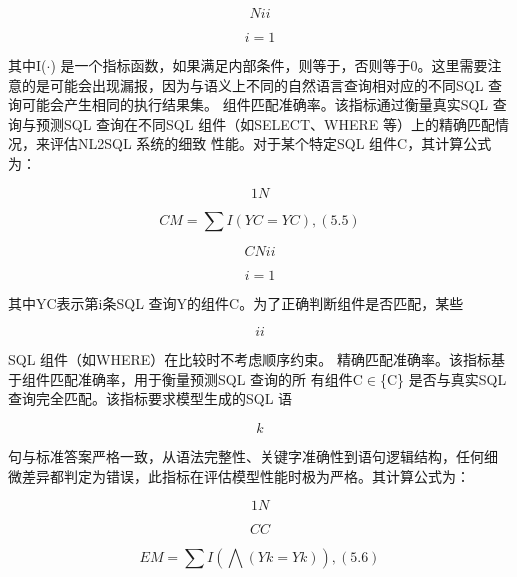 \documentclass[12pt,a4paper,openright,UTF8]{ctexbook}
\begin{document}
\begin{equation*}
Nii
\end{equation*}

\begin{equation*}
i=1
\end{equation*}

其中I($\cdot$) 是一个指标函数，如果满足内部条件，则等于，否则等于0。这里需要注 意的是可能会出现漏报，因为与语义上不同的自然语言查询相对应的不同SQL 查 询可能会产生相同的执行结果集。 组件匹配准确率。该指标通过衡量真实SQL 查询与预测SQL 查询在不同SQL 组件（如SELECT、WHERE 等）上的精确匹配情况，来评估NL2SQL 系统的细致 性能。对于某个特定SQL 组件C，其计算公式为：

\begin{equation*}
1N
\end{equation*}

\begin{equation*}
CM=\sum I(YC= YC) ,(5.5)
\end{equation*}

\begin{equation*}
CNii
\end{equation*}

\begin{equation*}
i=1
\end{equation*}

其中YC表示第i条SQL 查询Y的组件C。为了正确判断组件是否匹配，某些

\begin{equation*}
ii
\end{equation*}

SQL 组件（如WHERE）在比较时不考虑顺序约束。 精确匹配准确率。该指标基于组件匹配准确率，用于衡量预测SQL 查询的所 有组件C$\in$\{C\} 是否与真实SQL 查询完全匹配。该指标要求模型生成的SQL 语

\begin{equation*}
k
\end{equation*}

句与标准答案严格一致，从语法完整性、关键字准确性到语句逻辑结构，任何细 微差异都判定为错误，此指标在评估模型性能时极为严格。其计算公式为：

\begin{equation*}
1N
\end{equation*}

\begin{equation*}
CC
\end{equation*}

\begin{equation*}
EM =\sum I(\bigwedge(Yk= Yk)) ,(5.6)
\end{equation*}
\end{document}

